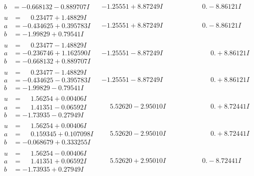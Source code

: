\documentclass[1p]{elsarticle_modified}
\theoremstyle{definition}
\begin{document}
$$\begin{array}{c|c|c}
\begin{aligned}
b &= -0.668132 - 0.889707 I\end{aligned}
 & -1.25551 + 8.87249 I & \phantom{-0.000000 } 0. - 8.86121 I \\ \hline\begin{aligned}
u &= \phantom{-}0.23477 + 1.48829 I \\
a &= -0.434625 + 0.395783 I \\
b &= -1.99829 + 0.79541 I\end{aligned}
 & -1.25551 + 8.87249 I & \phantom{-0.000000 } 0. - 8.86121 I \\ \hline\begin{aligned}
u &= \phantom{-}0.23477 - 1.48829 I \\
a &= -0.236746 + 1.162590 I \\
b &= -0.668132 + 0.889707 I\end{aligned}
 & -1.25551 - 8.87249 I & \phantom{-0.000000 -}0. + 8.86121 I \\ \hline\begin{aligned}
u &= \phantom{-}0.23477 - 1.48829 I \\
a &= -0.434625 - 0.395783 I \\
b &= -1.99829 - 0.79541 I\end{aligned}
 & -1.25551 - 8.87249 I & \phantom{-0.000000 -}0. + 8.86121 I \\ \hline\begin{aligned}
u &= \phantom{-}1.56254 + 0.00406 I \\
a &= \phantom{-}1.41351 - 0.06592 I \\
b &= -1.73935 - 0.27949 I\end{aligned}
 & \phantom{-}5.52620 - 2.95010 I & \phantom{-0.000000 -}0. + 8.72441 I \\ \hline\begin{aligned}
u &= \phantom{-}1.56254 + 0.00406 I \\
a &= \phantom{-}0.159345 + 0.107098 I \\
b &= -0.068679 + 0.333255 I\end{aligned}
 & \phantom{-}5.52620 - 2.95010 I & \phantom{-0.000000 -}0. + 8.72441 I \\ \hline\begin{aligned}
u &= \phantom{-}1.56254 - 0.00406 I \\
a &= \phantom{-}1.41351 + 0.06592 I \\
b &= -1.73935 + 0.27949 I\end{aligned}
 & \phantom{-}5.52620 + 2.95010 I & \phantom{-0.000000 } 0. - 8.72441 I \\ \hline\begin{aligned}

\end{aligned}
\end{array}$$
\end{document}
